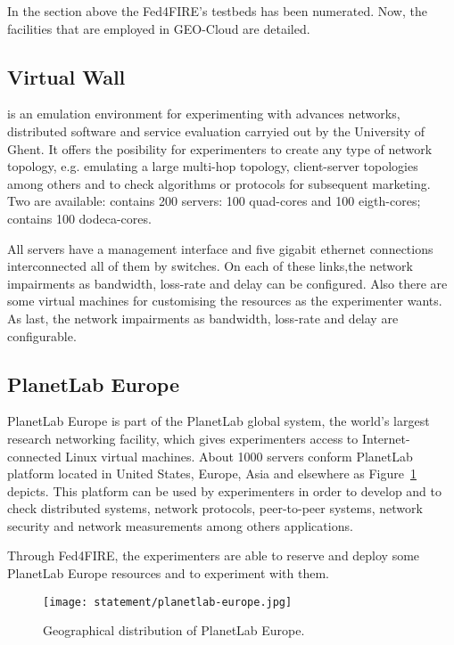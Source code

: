 In the section above the Fed4FIRE's testbeds has been numerated. Now, the
facilities that are employed in GEO-Cloud are detailed.

\subsection{Virtual Wall}

\vw is an emulation environment for
experimenting with advances networks, distributed software and service
evaluation carryied out by the University of Ghent. It offers the posibility for experimenters to create any type of
network topology, e.g. emulating a large multi-hop topology, client-server
topologies among others and to check algorithms or protocols for subsequent
marketing. 
Two \vw are available:  contains 200 servers: 100
quad-cores and 100 eigth-cores;  contains 100 dodeca-cores. 

All servers have a management interface and five gigabit ethernet connections
interconnected all of them by switches. On each of these links,the network
impairments as bandwidth, loss-rate and delay can be configured. Also there are some virtual machines for
customising the resources as the experimenter wants. As last, the network
impairments as bandwidth, loss-rate and delay are configurable.  

\subsection{PlanetLab Europe}

PlanetLab Europe is part of the PlanetLab global system, the world's largest
research networking facility, which gives experimenters access to
Internet-connected Linux virtual machines. About 1000 servers conform PlanetLab
platform located in United States, Europe, Asia and elsewhere as Figure~\ref{fig:intr-planetlab-europe} depicts. 
This platform can be used by experimenters in order to develop and to check
distributed systems, network protocols, peer-to-peer systems, network security
and network measurements among others applications.

Through Fed4FIRE, the experimenters are able to reserve and deploy some
PlanetLab Europe resources and to experiment with them.

\begin{figure}[!h]
\begin{center}
\texttt{[image: statement/planetlab-europe.jpg]}
\caption{Geographical distribution of PlanetLab Europe.}
\label{fig:intr-planetlab-europe}
\end{center}
\end{figure}

